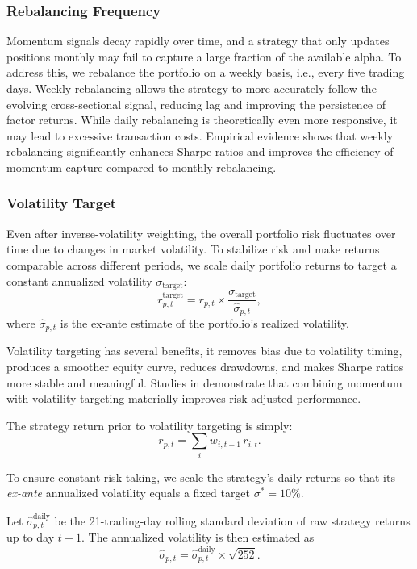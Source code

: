 \documentclass[12pt, a4paper]{article}
\begin{document}
	\subsubsection{Rebalancing Frequency}
	
	Momentum signals decay rapidly over time, and a strategy that only updates positions monthly may fail to capture a large fraction of the available alpha. To address this, we rebalance the portfolio on a weekly basis, i.e., every five trading days. Weekly rebalancing allows the strategy to more accurately follow the evolving cross-sectional signal, reducing lag and improving the persistence of factor returns. While daily rebalancing is theoretically even more responsive, it may lead to excessive transaction costs. Empirical evidence \cite{3} shows that weekly rebalancing significantly enhances Sharpe ratios and improves the efficiency of momentum capture compared to monthly rebalancing.
	
	\subsubsection{Volatility Target}
	
	Even after inverse-volatility weighting, the overall portfolio risk fluctuates over time due to changes in market volatility. 
	To stabilize risk and make returns comparable across different periods, we scale daily portfolio returns to target a constant annualized volatility $\sigma_{\text{target}}$:
	\[
	r_{p,t}^{\text{target}} = r_{p,t} \times \frac{\sigma_{\text{target}}}{\hat{\sigma}_{p,t}},
	\]
	where $\hat{\sigma}_{p,t}$ is the ex-ante estimate of the portfolio's realized volatility. 
	
	Volatility targeting has several benefits, it removes bias due to volatility timing, produces a smoother equity curve, reduces drawdowns, and makes Sharpe ratios more stable and meaningful. 
	Studies in \cite{barroso} demonstrate that combining momentum with volatility targeting materially improves risk-adjusted performance.
	
	The strategy return prior to volatility targeting is simply:
	\[
	r_{p,t} = \sum_{i} w_{i,t-1}\, r_{i,t}.
	\]
	
	To ensure constant risk-taking, we scale the strategy's daily returns so that its \textit{ex-ante} annualized volatility equals a fixed target $\sigma^* = 10\%$.
	
	Let $\hat{\sigma}_{p,t}^{\text{daily}}$ be the 21-trading-day rolling standard deviation of raw strategy returns up to day $t-1$. The annualized volatility is then estimated as
	$$
	\hat{\sigma}_{p,t} = \hat{\sigma}_{p,t}^{\text{daily}} \times \sqrt{252}.
	$$
	
\end{document}
